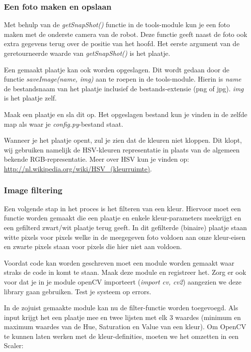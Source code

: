\documentclass[a4paper]{article}
\begin{document}
\subsubsection{Een foto maken en opslaan}
Met behulp van de \textit{getSnapShot()} functie in de tools-module kun je een foto maken met de onderste camera van de robot. Deze functie geeft naast de foto ook extra gegevens terug over de positie van het hoofd. Het eerste argument van de geretourneerde waarde van \textit{getSnapShot()} is het plaatje.

Een gemaakt plaatje kan ook worden opgeslagen. Dit wordt gedaan door de functie \textit{saveImage(name, img)} aan te roepen in de tools-module. Hierin is \textit{name} de bestandsnaam van het plaatje inclusief de bestands-extensie (png of jpg). \textit{img} is het plaatje zelf.

Maak een plaatje en sla dit op. Het opgeslagen bestand kun je vinden in de zelfde map als waar je \textit{config.py}-bestand staat.

Wanneer je het plaatje opent, zul je zien dat de kleuren niet kloppen. Dit klopt, wij gebruiken namelijk de HSV-kleuren representatie in plaats van de algemeen bekende RGB-representatie.
Meer over HSV kun je vinden op: \url{http://nl.wikipedia.org/wiki/HSV_(kleurruimte)}.

\subsubsection{Image filtering}
Een volgende stap in het proces is het filteren van een kleur. Hiervoor moet een functie worden gemaakt die een plaatje en enkele kleur-parameters meekrijgt en een gefilterd zwart/wit plaatje terug geeft.
In dit gefilterde (binaire) plaatje staan witte pixels voor pixels welke in de meegegeven foto voldoen aan onze kleur-eisen en zwarte pixels staan voor pixels die hier niet aan voldoen.

Voordat code kan worden geschreven moet een module worden gemaakt waar straks de code in komt te staan. Maak deze module en registreer het. Zorg er ook voor dat je in je module openCV importeert (\textit{import cv, cv2}) aangezien we deze library gaan gebruiken. Test je systeem op errors.

In de zojuist gemaakte module kan nu de filter-functie worden toegevoegd.
Als input krijgt het een plaatje mee en twee lijsten met elk 3 waardes (minimum en maximum waardes van de Hue, Saturation en Value van een kleur).
Om OpenCV te kunnen laten werken met de kleur-definities, moeten we het omzetten in een Scaler:
\end{document}
